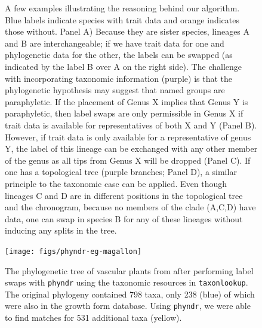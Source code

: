 \documentclass[a4paper,11pt]{article}
\newcommand{\phyndr}{\tt phyndr}
\newcommand{\taxonlookup}{\tt taxonlookup}
\begin{document}
\addtocounter{figure}{-1}
\begin{figure} [p]
  \caption{A few examples illustrating the reasoning behind our algorithm. Blue labels indicate species with trait data and orange indicates those without. Panel A) Because they are sister species, lineages A and B are interchangeable; if we have trait data for one and phylogenetic data for the other, the labels can be swapped (as indicated by the label B over A on the right side). The challenge with incorporating taxonomic information (purple) is that the phylogenetic hypothesis may suggest that named groups are paraphyletic. If the placement of Genus X implies that Genus Y is paraphyletic, then label swaps are only permissible in Genus X if trait data is available for representatives of both X and Y (Panel B). However, if trait data is only available for a representative of genus Y, the label of this lineage can be exchanged with any other member of the genus as all tips from Genus X will be dropped (Panel C). If one has a topological tree (purple branches; Panel D), a similar principle to the taxonomic case can be applied. Even though lineages C and D are in different positions in the topological tree and the chronogram, because no members of the clade (A,C,D) have data, one can swap in species B for any of these lineages without inducing any splits in the tree.}
\end{figure}

\begin{figure}[p]
\texttt{[image: figs/phyndr-eg-magallon]}
\caption{The phylogenetic tree of vascular plants from \citet{Magallon2015} after performing label swaps with {\phyndr} using the taxonomic resources in {\taxonlookup}. The original phylogeny contained 798 taxa, only 238 (blue) of which were also in the growth form database. Using {\phyndr}, we were able to find matches for 531 additional taxa (yellow).}
\label{fig:plant-tree}
\end{figure}
\end{document}
